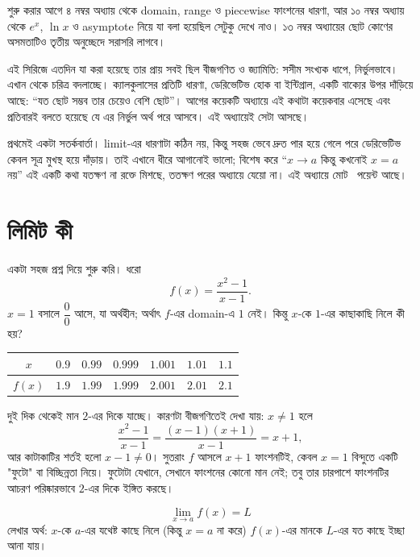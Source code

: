 \documentclass[11pt]{article}
\begin{document}

\noindent
শুরু করার আগে ৪ নম্বর অধ্যায় থেকে domain, range ও piecewise ফাংশনের ধারণা,
আর ১০ নম্বর অধ্যায় থেকে $e^{x}$, $\ln x$ ও asymptote নিয়ে যা বলা হয়েছিল
সেটুকু দেখে নাও। ১৩ নম্বর অধ্যায়ের ছোট কোণের অসমতাটিও তৃতীয় অনুচ্ছেদে
সরাসরি লাগবে।

এই সিরিজে এতদিন যা করা হয়েছে তার প্রায় সবই ছিল বীজগণিত ও জ্যামিতি: সসীম সংখ্যক
ধাপে, নির্ভুলভাবে। এখান থেকে চরিত্র বদলাচ্ছে। ক্যালকুলাসের প্রতিটি ধারণা,
ডেরিভেটিভ হোক বা ইন্টিগ্রাল, একটি বাক্যের উপর দাঁড়িয়ে আছে: ``যত ছোট সম্ভব তার চেয়েও বেশি ছোট''।
আগের কয়েকটি অধ্যায়ে এই কথাটা কয়েকবার এসেছে এবং প্রতিবারই বলতে হয়েছে যে
এর নির্ভুল অর্থ পরে আসবে। এই অধ্যায়েই সেটা আসছে।

প্রথমেই একটা সতর্কবার্তা। limit-এর ধারণাটা কঠিন নয়, কিন্তু সহজ ভেবে দ্রুত পার
হয়ে গেলে পরে ডেরিভেটিভ কেবল সূত্র মুখস্থ হয়ে দাঁড়ায়। তাই এখানে ধীরে আগানোই ভালো;
বিশেষ করে ``$x \to a$ কিন্তু কখনোই $x = a$ নয়'' এই একটি কথা যতক্ষণ না রক্তে
মিশছে, ততক্ষণ পরের অধ্যায়ে যেয়ো না। এই অধ্যায়ে মোট \totalpoints\
পয়েন্ট আছে।

\section{লিমিট কী}

একটা সহজ প্রশ্ন দিয়ে শুরু করি। ধরো
\[
  f(x) = \frac{x^{2}-1}{x-1} .
\]
$x = 1$ বসালে $\dfrac{0}{0}$ আসে, যা অর্থহীন; অর্থাৎ $f$-এর domain-এ $1$ নেই।
কিন্তু $x$-কে $1$-এর কাছাকাছি নিলে কী হয়?

\begin{center}
\begin{tabular}{c|c|c|c|c|c|c}
 $x$ & $0.9$ & $0.99$ & $0.999$ & $1.001$ & $1.01$ & $1.1$ \\ \hline
 $f(x)$ & $1.9$ & $1.99$ & $1.999$ & $2.001$ & $2.01$ & $2.1$ \\
\end{tabular}
\end{center}

দুই দিক থেকেই মান $2$-এর দিকে যাচ্ছে। কারণটা বীজগণিতেই দেখা যায়: $x \neq 1$
হলে
\[
  \frac{x^{2}-1}{x-1} = \frac{(x-1)(x+1)}{x-1} = x+1 ,
\]
আর কাটাকাটির শর্তই হলো $x - 1 \neq 0$। সুতরাং $f$ আসলে $x+1$ ফাংশনটিই, কেবল
$x = 1$ বিন্দুতে একটি "ফুটো" বা বিচ্ছিন্নতা নিয়ে। ফুটোটা যেখানে, সেখানে ফাংশনের কোনো মান নেই;
তবু তার চারপাশে ফাংশনটির আচরণ পরিষ্কারভাবে $2$-এর দিকে ইঙ্গিত করছে।

\begin{idea}[Limit]
\[
  \lim_{x \to a} f(x) = L
\]
লেখার অর্থ: $x$-কে $a$-এর যথেষ্ট কাছে নিলে (কিন্তু $x = a$ না করে) $f(x)$-এর
মানকে $L$-এর যত কাছে ইচ্ছা আনা যায়।
\end{idea}
\end{document}
